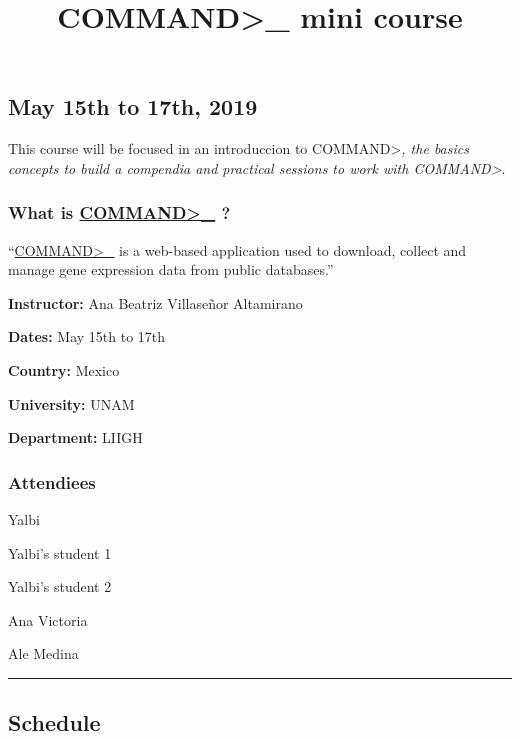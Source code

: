 \documentclass[]{article}
\title{COMMAND\textgreater{}\_ mini course}
\author{}
\date{}
\begin{document}
\maketitle

\subsection{ May 15th to 17th, 2019}\label{may-15th-to-17th-2019}

This course will be focused in an introduccion to
COMMAND\textgreater{}\emph{, the basics concepts to build a compendia
and practical sessions to work with COMMAND\textgreater{}}.

\subsubsection{\texorpdfstring{What is
\href{https://command.readthedocs.io/en/latest/\#}{COMMAND\textgreater{}\_}
?}{What is COMMAND\textgreater{}\_ ?}}\label{what-is-command_}

``\href{https://command.readthedocs.io/en/latest/\#}{COMMAND\textgreater{}\_}
is a web-based application used to download, collect and manage gene
expression data from public databases.''

 \textbf{Instructor:} Ana Beatriz Villaseñor Altamirano

 \textbf{Dates:} May 15th to 17th

 \textbf{Country:} Mexico

 \textbf{University:} UNAM

 \textbf{Department:} LIIGH

\subsubsection{Attendiees}\label{attendiees}

 Yalbi

 Yalbi's student 1

 Yalbi's student 2

 Ana Victoria

 Ale Medina

\begin{center}\rule{0.5\linewidth}{\linethickness}\end{center}

\subsection{Schedule}\label{schedule}
\end{document}
